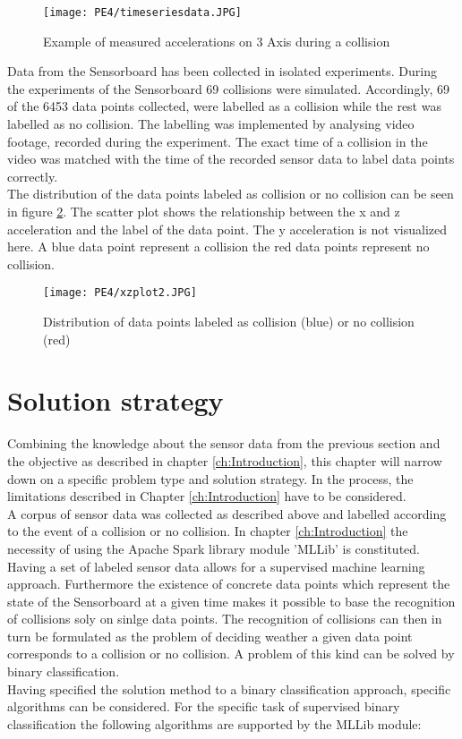 \begin{figure}[h]
\centering
\texttt{[image: PE4/timeseriesdata.JPG]}
\caption{Example of measured accelerations on 3 Axis during a collision }
\label{fig:timeaxis}
\end{figure}

Data from the Sensorboard has been collected in isolated experiments. During the experiments of the Sensorboard 69 collisions were simulated. Accordingly, 69 of the 6453 data points collected,  were labelled as a collision while the rest was labelled  as no collision. The labelling was implemented by analysing video footage, recorded during the experiment. The exact time of a collision in the video was matched with the time of the recorded sensor data to label data points correctly.\\
The distribution of the data points labeled as collision or no collision can be seen in figure \ref{fig:xyscatter}. The scatter plot shows the relationship between the x and z acceleration and the label of the data point. The y acceleration is not visualized here. A blue data point represent a collision the red data points represent no collision.

\begin{figure}[h]
\centering
\texttt{[image: PE4/xzplot2.JPG]}
\caption{Distribution of data points labeled as collision (blue) or no collision (red)}
\label{fig:xyscatter}
\end{figure}

\section{Solution strategy}
\label{sec:Solution strategy}
Combining the knowledge about the sensor data from the previous section and the objective as described in chapter \ref{ch:Introduction}, this chapter will narrow down on a specific problem type and solution strategy. In the process, the limitations described in Chapter \ref{ch:Introduction} have to be considered. \\
A corpus of sensor data was collected as described above and labelled according to the event of a collision or no collision. In chapter \ref{ch:Introduction}  the necessity of using the Apache Spark library module 'MLLib' is constituted.
\\ 
Having a set of labeled sensor data allows for a supervised machine learning approach.  Furthermore the existence of concrete data points which represent the state of the Sensorboard at a given time makes it possible to base the recognition of collisions soly on sinlge data points. The recognition of collisions can then in turn be formulated as the problem of deciding weather a given data point corresponds to a collision or no collision. A problem of this kind can be solved by binary classification. \\
Having specified the solution method to a binary classification approach, specific algorithms can be considered. For the specific task of supervised binary classification the following algorithms are supported by the MLLib module:


